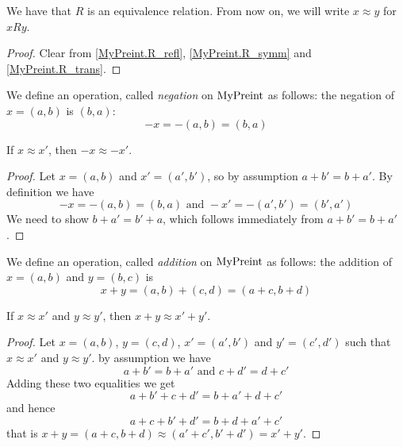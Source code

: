\begin{lemma}
    \label{MyPreint.R_equiv}
    \leanok
We have that $R$ is an equivalence relation. From now on, we will write $x \approx y$ for
$x R y$.
\end{lemma}
\begin{proof}
    \leanok
Clear from \ref{MyPreint.R_refl}, \ref{MyPreint.R_symm} and \ref{MyPreint.R_trans}.
\end{proof}

\begin{definition}
    \label{MyPreint.neg}
    \leanok
We define an operation, called \emph{negation} on $\mathrm{MyPreint}$ as follows: the negation of $x = (a,b)$ is
$(b,a)$:
\[
-x = -(a,b) = (b,a)
\]
\end{definition}

\begin{lemma}
    \label{MyPreint.neg_quotient}
    \leanok
If $x \approx x'$, then $-x \approx -x'$.
\end{lemma}
\begin{proof}
\leanok
Let $x = (a,b)$ and $x' = (a',b')$, so by assumption $a + b' = b + a'$. By definition we have
\[
-x=-(a,b)=(b,a) \mbox{ and } -x'=-(a',b')=(b',a')
\]
We need to show $b+a'=b'+a$, which follows immediately from $a + b' = b + a'$.
\end{proof}

\begin{definition}
    \label{MyPreint.add}
    \leanok
We define an operation, called \emph{addition} on $\mathrm{MyPreint}$ as follows: the addition of $x = (a,b)$
and $y = (b, c)$ is
\[
x + y = (a,b) + (c,d) = (a+c, b + d)
\]
\end{definition}

\begin{lemma}
    \label{MyPreint.add_quotient}
    \leanok
If $x \approx x'$ and $y \approx y'$, then $x + y \approx x' + y'$.
\end{lemma}
\begin{proof}
\leanok
Let $x = (a,b)$, $y = (c,d)$, $x' = (a',b')$ and $y' = (c',d')$ such that $x \approx x'$ and $y \approx y'$. by assumption we have
\[
a + b' = b + a' \mbox{ and } c + d' = d + c'
\]
Adding these two equalities we get
\[
a+b'+c+d'=b+a'+d+c'
\]
and hence
\[
a+c+b'+d'=b+d+a'+c'
\]
that is $x + y = (a+c,b+d) \approx (a'+c',b'+d') = x'+y'$.
\end{proof}

